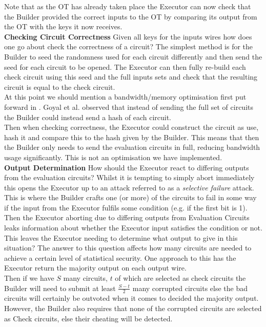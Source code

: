 \documentclass[ %
                    author={Nicholas Tutte},
                supervisor={Prof. Nigel Smart},
                    degree={MEng},
                     title={Secure Two Party Computation},
                  subtitle={A practical comparison of recent protocols},
                      type={Research - GG1K},
                      year={2015} ]{dissertation}
\begin{document}
				Note that as the OT has already taken place the Executor can now check that the Builder provided the correct inputs to the OT by comparing its output from the OT with the keys it now receives.\\

				\noindent \textbf{Checking Circuit Correctness} Given all keys for the inputs wires how does one go about check the correctness of a circuit? The simplest method is for the Builder to seed the randomness used for each circuit differently and then send the seed for each circuit to be opened. The Executor can then fully re-build each check circuit using this seed and the full inputs sets and check that the resulting circuit is equal to the check circuit.\\

				At this point we should mention a bandwidth/memory optimisation first put forward in \cite{HashCheckOpt}. Goyal et al. observed that instead of sending the full set of circuits the Builder could instead send a hash of each circuit.\\

				Then when checking correctness, the Executor could construct the circuit as use, hash it and compare this to the hash given by the Builder. This means that then the Builder only needs to send the evaluation circuits in full, reducing bandwidth usage significantly. This is not an optimisation we have implemented.\\

				\noindent \textbf{Output Determination} How should the Executor react to differing outputs from the evaluation circuits? Whilst it is tempting to simply abort immediately this opens the Executor up to an attack referred to as a \emph{selective failure} attack. This is where the Builder crafts one (or more) of the circuits to fail in some way if the input from the Executor fulfils some condition (e.g. if the first bit is 1). Then the Executor aborting due to differing outputs from Evaluation Circuits leaks information about whether the Executor input satisfies the condition or not.\\

				This leaves the Executor needing to determine what output to give in this situation? The answer to this question affects how many circuits are needed to achieve a certain level of statistical security. One approach to this has the Executor return the majority output on each output wire.\\
				
				Then if we have $S$ many circuits, $t$ of which are selected as check circuits the Builder will need to submit at least $\frac{S - t}{2}$ many corrupted circuits else the bad circuits will certainly be outvoted when it comes to decided the majority output. However, the Builder also requires that none of the corrupted circuits are selected as Check circuits, else their cheating will be detected.\\
\end{document}

